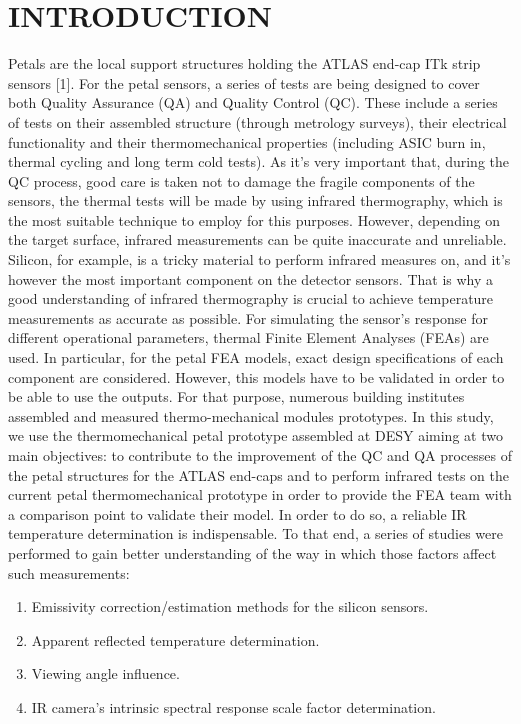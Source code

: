 \pagestyle{introduction}

\section*{\uppercase{Introduction}}\label{intro}
	\bigskip
	\bigskip
	Petals are the local support structures holding the ATLAS end-cap ITk strip sensors [1]. For the petal sensors, a series of tests are being designed to cover both Quality Assurance (QA) and Quality Control (QC). These include a series of tests on their assembled structure (through metrology surveys), their electrical functionality and their thermomechanical properties (including ASIC burn in, thermal cycling and long term cold tests). 
	As it's very important that, during the QC process, good care is taken not to damage the fragile components of the sensors, the thermal tests will be made by using infrared thermography, which is the most suitable technique to employ for this purposes. However, depending on the target surface, infrared measurements can be quite inaccurate and unreliable. Silicon, for example, is a tricky material to perform infrared measures on, and it's however the most important component on the detector sensors. That is why a good understanding of infrared thermography is crucial to achieve temperature measurements as accurate as possible.
	For simulating the sensor's response for different operational parameters, thermal Finite Element Analyses (FEAs) are used. In particular, for the petal FEA models, exact design specifications of each component are considered. However, this models have to be validated in order to be able to use the outputs. For that purpose, numerous building institutes assembled and measured thermo-mechanical modules prototypes. 
	In this study, we use the thermomechanical petal prototype assembled at DESY aiming at two main objectives: to contribute to the improvement of the QC and QA processes of the petal structures for the ATLAS end-caps and to perform infrared tests on the current petal thermomechanical prototype in order to provide the FEA team with a comparison point to validate their model. In order to do so, a reliable IR temperature determination is indispensable. To that end, a series of studies were performed to gain better understanding of the way in which those factors affect such measurements:
	
	\begin{enumerate}
		\item Emissivity correction/estimation methods for the silicon sensors.
		\item Apparent reflected temperature determination.
		\item Viewing angle influence.
		\item IR camera's intrinsic spectral response scale factor determination.
	\end{enumerate}
	
